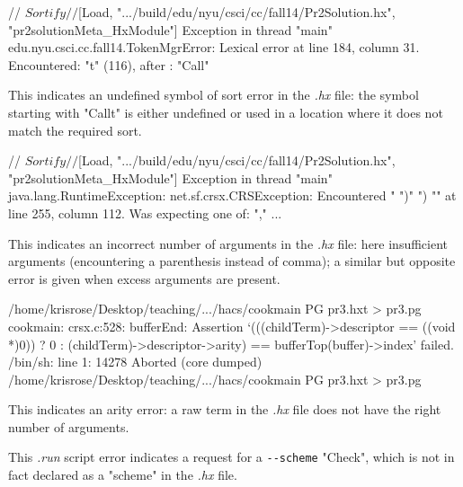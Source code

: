 \documentclass[11pt]{article} %
\begin{document}
\begin{error}\leavevmode
  \begin{code}
// $Sortify
// $[Load, ".../build/edu/nyu/csci/cc/fall14/Pr2Solution.hx", "pr2solutionMeta_HxModule"]
Exception in thread "main" edu.nyu.csci.cc.fall14.TokenMgrError:
   Lexical error at line 184, column 31.  Encountered: "t" (116), after : "Call"
  \end{code}
  This indicates an undefined symbol of sort error in the \emph{.hx} file: the symbol
  starting with "Callt" is either undefined or used in a location where it does not match the
  required sort.
\end{error}

\begin{error}\leavevmode
  \begin{code}
// $Sortify
// $[Load, ".../build/edu/nyu/csci/cc/fall14/Pr2Solution.hx", "pr2solutionMeta_HxModule"]
Exception in thread "main" java.lang.RuntimeException: net.sf.crsx.CRSException:
   Encountered " ")" ") "" at line 255, column 112.
Was expecting one of:
    "," ...
  \end{code}
  This indicates an incorrect number of arguments in the \emph{.hx} file: here insufficient
  arguments (encountering a parenthesis instead of comma); a similar but opposite error is given
  when excess arguments are present.
\end{error}

\begin{error}\leavevmode
  \begin{code}
/home/krisrose/Desktop/teaching/.../hacs/cookmain PG pr3.hxt > pr3.pg
cookmain: crsx.c:528: bufferEnd: Assertion
   `(((childTerm)->descriptor == ((void *)0)) ? 0 :
        (childTerm)->descriptor->arity) == bufferTop(buffer)->index' failed.
/bin/sh: line 1: 14278 Aborted
  (core dumped) /home/krisrose/Desktop/teaching/.../hacs/cookmain PG pr3.hxt > pr3.pg
  \end{code}
  This indicates an arity error: a raw term in the \emph{.hx} file does not have the right number of
  arguments.
\end{error}

\begin{error}[]\leavevmode
  \begin{code}
« $Print-Check[
...
»
  \end{code}
  This \emph{.run} script error indicates a request for a \verb'--scheme' "Check", which is not in
  fact declared as a "scheme" in the \emph{.hx} file.
\end{error}
\end{document}
